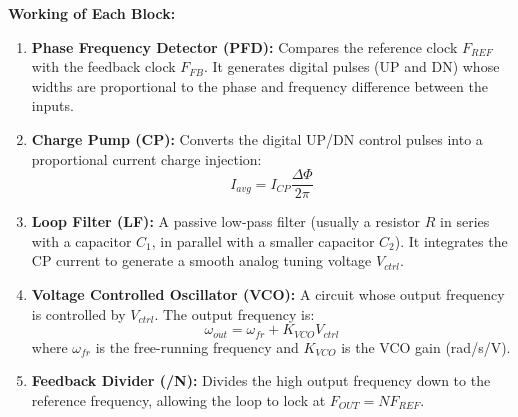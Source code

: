 \documentclass[12pt,a4paper]{article}
\begin{document}
\begin{tcolorbox}[tikzbox, title={Block Diagram of a Charge-Pump PLL}]
\centering
{}
\end{tcolorbox}

\textbf{Working of Each Block:}
\begin{enumerate}[label=\textbf{\arabic*.}, leftmargin=*, itemsep=3pt]
  \item \textbf{Phase Frequency Detector (PFD):} Compares the reference clock $F_{REF}$ with the feedback clock $F_{FB}$. It generates digital pulses (UP and DN) whose widths are proportional to the phase and frequency difference between the inputs.
  \item \textbf{Charge Pump (CP):} Converts the digital UP/DN control pulses into a proportional current charge injection:
  \[
  I_{avg} = I_{CP} \frac{\Delta \Phi}{2\pi}
  \]
  \item \textbf{Loop Filter (LF):} A passive low-pass filter (usually a resistor $R$ in series with a capacitor $C_1$, in parallel with a smaller capacitor $C_2$). It integrates the CP current to generate a smooth analog tuning voltage $V_{ctrl}$.
  \item \textbf{Voltage Controlled Oscillator (VCO):} A circuit whose output frequency is controlled by $V_{ctrl}$. The output frequency is:
  \[
  \omega_{out} = \omega_{fr} + K_{VCO} V_{ctrl}
  \]
  where $\omega_{fr}$ is the free-running frequency and $K_{VCO}$ is the VCO gain (rad/s/V).
  \item \textbf{Feedback Divider (/N):} Divides the high output frequency down to the reference frequency, allowing the loop to lock at $F_{OUT} = N F_{REF}$.
\end{enumerate}
\end{document}
